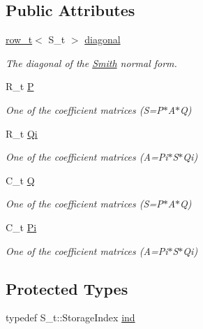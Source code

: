 \subsection*{Public Attributes}
\begin{DoxyCompactItemize}
\item 
\hyperlink{namespaceMackey_a6d37801553e585770ca7d1243ab3b213}{row\+\_\+t}$<$ S\+\_\+t $>$ \hyperlink{classMackey_1_1Smith_a4d7f709505152b53130018e46f9e8411}{diagonal}
\begin{DoxyCompactList}\small\item\em The diagonal of the \hyperlink{classMackey_1_1Smith}{Smith} normal form. \end{DoxyCompactList}\item 
R\+\_\+t \hyperlink{classMackey_1_1Smith_a711a1726ec0da22e9233aa269d66bf73}{P}
\begin{DoxyCompactList}\small\item\em One of the coefficient matrices (S=P$\ast$\+A$\ast$Q) \end{DoxyCompactList}\item 
R\+\_\+t \hyperlink{classMackey_1_1Smith_a8446d6e35feabbdc233e2a15efde4930}{Qi}
\begin{DoxyCompactList}\small\item\em One of the coefficient matrices (A=Pi$\ast$\+S$\ast$\+Qi) \end{DoxyCompactList}\item 
C\+\_\+t \hyperlink{classMackey_1_1Smith_aba53f81430955d8cf7f7ce4677486214}{Q}
\begin{DoxyCompactList}\small\item\em One of the coefficient matrices (S=P$\ast$\+A$\ast$Q) \end{DoxyCompactList}\item 
C\+\_\+t \hyperlink{classMackey_1_1Smith_a890f70fcd15554ee0c3b8469ffb55fde}{Pi}
\begin{DoxyCompactList}\small\item\em One of the coefficient matrices (A=Pi$\ast$\+S$\ast$\+Qi) \end{DoxyCompactList}\end{DoxyCompactItemize}
\subsection*{Protected Types}
\begin{DoxyCompactItemize}
\item 
typedef S\+\_\+t\+::\+Storage\+Index \hyperlink{classMackey_1_1Smith_acf2eec378d950576afd70dc941cad0c4}{ind}
\end{DoxyCompactItemize}
